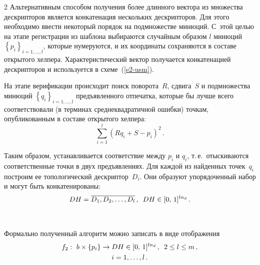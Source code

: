 \begin{multicols}{2}
      Альтернативным способом получения более длинного вектора из множества 
дескрипторов является конкатенация нескольких дескрипторов. Для этого необходимо 
ввести некоторый порядок на подмножестве минюций. С~этой целью на этапе 
регистрации из шаблона выбираются случайным образом $l$ минюций 
$\left\{p_i\right\}_{i=1,\ldots ,l}$, которые нумеруются, и их координаты сохраняются в 
составе открытого хелпера. Характеристический вектор получается конкатенацией 
дескрипторов и используется в схеме~(\ref{e2-usm}).
      
      На этапе верификации происходит поиск поворота~$R$, сдвига~$S$ и 
подмножества минюций $\left\{q_i\right\}_{i=1,\ldots ,l}$ предъявленного отпечатка, которые бы 
лучше всего соответствовали (в терминах среднеквадратичной ошибки) точкам, 
опубликованным в составе открытого хелпера:
      \begin{equation*}
      \sum\limits_{i=1}^l \left( Rq_i+S-p_i\right)^2\,.
      \end{equation*}
      
      Таким образом, устанавливается соответствие между $p_i$ и $q_i$, т.\,е.\ 
отыскиваются соответственные точки в двух предъявлениях. Для каждой из найден\-ных 
точек~$q_i$ построим ее топологический дескриптор~$D_i$. Они образуют 
упорядоченный набор и могут быть конкатенированы:
      \begin{equation*}
      DH=\overline{D_1, D_2, \ldots , D_l}\,,\enskip DH\in [0,\,1]^{ln_d}\,.
      \end{equation*}
      
      \begin{figure} %
 \vspace*{1pt}
 \begin{center}
 \mbox{%
 \epsfxsize=124.286mm
 }
 \end{center}
 \vspace*{-9pt}
\end{figure}
      
      Формально полученный алгоритм можно записать в виде отображения
      \begin{multline*}
      f_2:\ b\times \left\{ p_i\right\} \rightarrow DH\in [0,\,1]^{ln_d}\,,\enskip 
      2\leq l\leq m\,,\\
      i=1,  \ldots , l\,.
      \end{multline*}
      

\end{multicols}
